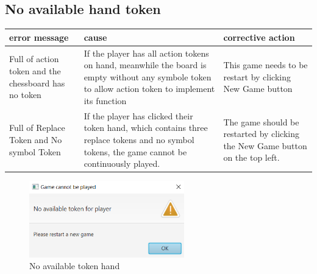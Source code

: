 
\subsection{No available hand token}

\begin{table}[h]
	\centering
	\begin{tabular}{p{2.5cm}@{\hskip 5mm}  p{5cm}@{\hskip 5mm} p{6.5cm}} 
		\toprule
		error message   & cause      & corrective action  \\ 
		\midrule
		\midrule
		Full of action token and the chessboard has no token  & If the player has all action tokens on hand, meanwhile the board is empty without any symbole token to allow action token to implement its function &  This game needs to be restart by clicking New Game button  \\
		\midrule
		Full of Replace Token and No symbol Token  & If the player has clicked their token hand, which contains three replace tokens and no symbol tokens, the game cannot be continuously played.  &  The game should be restarted by clicking the New Game button on the top left.  \\
		\bottomrule
	\end{tabular}
\end{table}

\begin{figure}[h]
	\centering
	\includegraphics[width=0.6\textwidth]{image/NoToken}
	\caption{No available token hand}
	\label{fig:No available token hand}
\end{figure}